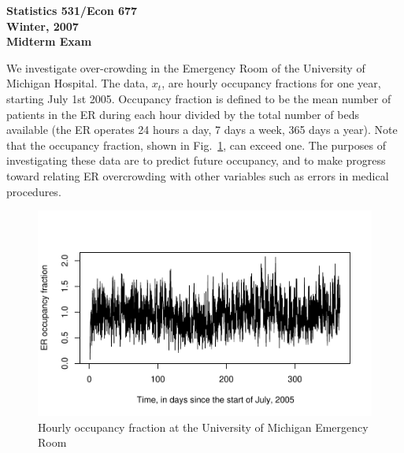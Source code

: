 \documentclass[11pt]{article}
\def\bc{\begin{center}}
\def\ec{\end{center}}
\begin{document}
\begin{center}
{\bf Statistics 531/Econ 677\\

Winter, 2007\\

Midterm Exam}
\end{center}

We investigate over-crowding in the Emergency Room of the University of Michigan Hospital.
The data, $x_t$, are hourly occupancy fractions for one year, starting July 1st 2005. Occupancy fraction is defined to be the mean number of patients in the ER during each hour  divided by the total number of beds available (the ER operates 24 hours a day, 7 days a week, 365 days a year).
Note that the occupancy fraction, shown in Fig.~\ref{fig:er}, can exceed one.
The purposes of investigating these data are to predict future occupancy, and to make progress toward relating ER overcrowding with other variables such as errors in medical procedures.
\begin{figure}[h]
\bc
\vspace{-1cm}
\includegraphics[width=5in]{ER-um-05}
\vspace{-1cm}
\ec
\caption{Hourly occupancy fraction at the University of Michigan Emergency Room}\label{fig:er}
\end{figure}
\end{document}
